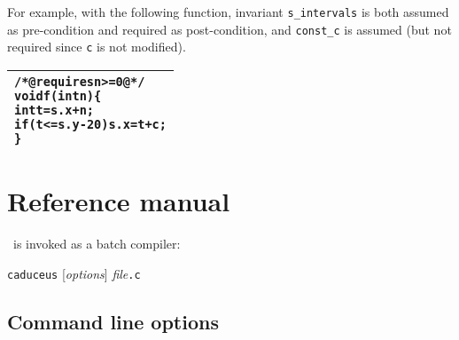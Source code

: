 \documentclass[12pt,a4paper,twoside,openright]{report}
\newenvironment{code}{\begin{small}\begin{alltt}%
\begin{tabular}{|p{0.97\textwidth}|}\hline%
}{\\\hline\end{tabular}\end{alltt}\end{small}}
\begin{document}
For example, with the following function, invariant
\texttt{s\_intervals} is both assumed as pre-condition and required as
post-condition, and \texttt{const\_c} is assumed (but not required
since \texttt{c} is not modified).
\begin{code}
/*@ requires n>=0 @*/
void f(int n) \{
  int t = s.x+n;
  if (t <= s.y - 20) s.x = t + c ;
\}
\end{code}



\chapter{Reference manual}
\label{refman}

\caduceus\ is invoked as a batch compiler:
\begin{center}
  \texttt{caduceus} [\textit{options}] \textit{file}\texttt{.c}
\end{center}

\section{Command line options}
\label{usage}
\end{document}
